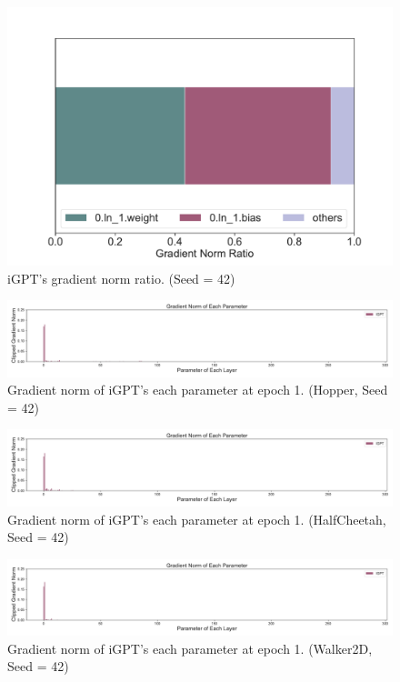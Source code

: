 \documentclass{article}
\begin{document}
\begin{figure}[H]
\begin{minipage}[b]{0.32\linewidth}
        \includegraphics[width=\linewidth]{figs/gradnorm_perparam_ratio_1_igpt_walker2d_medium_42.pdf}
    \end{minipage}
    \caption{iGPT's gradient norm ratio. (Seed = 42)}
\end{figure}

\begin{figure}[H]
    \centering
        \includegraphics[width=\linewidth]{figs/gradnorm_perparam_1_igpt_hopper_medium_42.pdf}
    \caption{Gradient norm of iGPT's each parameter at epoch 1. (Hopper, Seed = 42)}
\end{figure}

\begin{figure}[H]
    \centering
        \includegraphics[width=\linewidth]{figs/gradnorm_perparam_1_igpt_halfcheetah_medium_42.pdf}
    \caption{Gradient norm of iGPT's each parameter at epoch 1. (HalfCheetah, Seed = 42)}
\end{figure}

\begin{figure}[H]
    \centering
        \includegraphics[width=\linewidth]{figs/gradnorm_perparam_1_igpt_walker2d_medium_42.pdf}
    \caption{Gradient norm of iGPT's each parameter at epoch 1. (Walker2D, Seed = 42)}
\end{figure}
\end{document}
